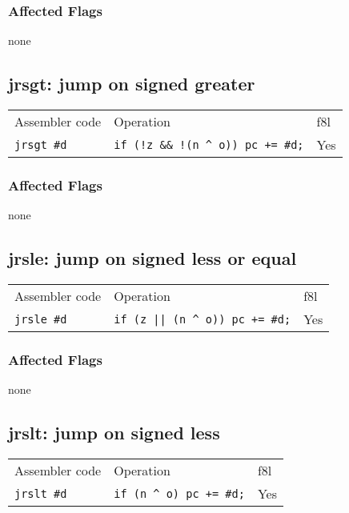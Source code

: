 \documentclass{book}
\begin{document}
\subsubsection*{Affected Flags}

none


\subsection{jrsgt: jump on signed greater}

\begin{tabular}{l l l}
Assembler code     & Operation                            & f8l \\
\texttt{jrsgt \#d} & \texttt{if (!z \&\& !(n \^{} o)) pc += \#d;} & Yes \\
\end{tabular}

\subsubsection*{Affected Flags}

none

\subsection{jrsle: jump on signed less or equal}

\begin{tabular}{l l l}
Assembler code   & Operation                  & f8l \\
\texttt{jrsle \#d} & \texttt{if (z || (n \^{} o)) pc += \#d;} & Yes \\
\end{tabular}

\subsubsection*{Affected Flags}

none


\subsection{jrslt: jump on signed less}

\begin{tabular}{l l l}
Assembler code     & Operation                         & f8l \\
\texttt{jrslt \#d} & \texttt{if (n \^{} o) pc += \#d;} & Yes \\
\end{tabular}
\end{document}
